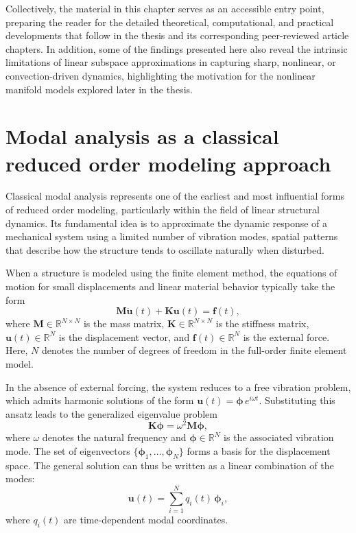 Collectively, the material in this chapter serves as an accessible entry point, preparing the reader for the detailed theoretical, computational, and practical developments that follow in the thesis and its corresponding peer-reviewed article chapters. In addition, some of the findings presented here also reveal the intrinsic limitations of linear subspace approximations in capturing sharp, nonlinear, or convection-driven dynamics, highlighting the motivation for the nonlinear manifold models explored later in the thesis.

\section{Modal analysis as a classical reduced order modeling approach}

Classical modal analysis represents one of the earliest and most influential forms of reduced order modeling, particularly within the field of linear structural dynamics. Its fundamental idea is to approximate the dynamic response of a mechanical system using a limited number of vibration modes, spatial patterns that describe how the structure tends to oscillate naturally when disturbed.

When a structure is modeled using the finite element method, the equations of motion for small displacements and linear material behavior typically take the form
\begin{equation}
\mathbf{M} \ddot{\mathbf{u}}(t) + \mathbf{K} \mathbf{u}(t) = \mathbf{f}(t),
\end{equation}
where \( \mathbf{M} \in \mathbb{R}^{N \times N} \) is the mass matrix, \( \mathbf{K} \in \mathbb{R}^{N \times N} \) is the stiffness matrix, \( \mathbf{u}(t) \in \mathbb{R}^N \) is the displacement vector, and \( \mathbf{f}(t) \in \mathbb{R}^N \) is the external force. Here, \( N \) denotes the number of degrees of freedom in the full-order finite element model.

In the absence of external forcing, the system reduces to a free vibration problem, which admits harmonic solutions of the form \( \mathbf{u}(t) = \boldsymbol{\phi} \, e^{i \omega t} \). Substituting this ansatz leads to the generalized eigenvalue problem
\begin{equation}
\mathbf{K} \boldsymbol{\phi} = \omega^2 \mathbf{M} \boldsymbol{\phi},
\end{equation}
where \( \omega \) denotes the natural frequency and \( \boldsymbol{\phi} \in \mathbb{R}^N \) is the associated vibration mode. The set of eigenvectors \( \{ \boldsymbol{\phi}_1, \dots, \boldsymbol{\phi}_N \} \) forms a basis for the displacement space. The general solution can thus be written as a linear combination of the modes:
\begin{equation}
\mathbf{u}(t) = \sum_{i=1}^N q_i(t) \, \boldsymbol{\phi}_i,
\end{equation}
where \( q_i(t) \) are time-dependent modal coordinates.

